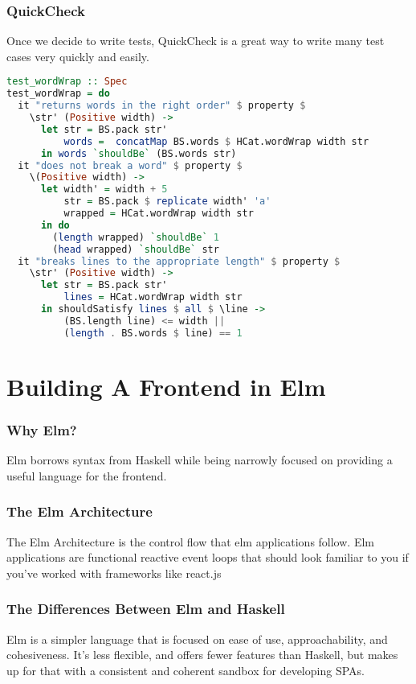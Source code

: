 \documentclass{beamer}
\begin{document}
\begin{frame}[fragile]
  \frametitle{QuickCheck}
  Once we decide to write tests, QuickCheck is a great way to write
  many test cases very quickly and easily.
\begin{lstlisting}[language=haskell]
test_wordWrap :: Spec
test_wordWrap = do
  it "returns words in the right order" $ property $
    \str' (Positive width) ->
      let str = BS.pack str'
          words =  concatMap BS.words $ HCat.wordWrap width str
      in words `shouldBe` (BS.words str)
  it "does not break a word" $ property $
    \(Positive width) ->
      let width' = width + 5
          str = BS.pack $ replicate width' 'a'
          wrapped = HCat.wordWrap width str
      in do
        (length wrapped) `shouldBe` 1
        (head wrapped) `shouldBe` str
  it "breaks lines to the appropriate length" $ property $
    \str' (Positive width) ->
      let str = BS.pack str'
          lines = HCat.wordWrap width str
      in shouldSatisfy lines $ all $ \line ->
          (BS.length line) <= width ||
          (length . BS.words $ line) == 1
\end{lstlisting}
\end{frame}

\section{Building A Frontend in Elm}

\begin{frame}
  \frametitle{Why Elm?}
  Elm borrows syntax from Haskell while being narrowly focused on
  providing a useful language for the frontend.
\end{frame}

\begin{frame}
  \frametitle{The Elm Architecture}
  The Elm Architecture is the control flow that elm applications
  follow.  Elm applications are functional reactive event loops that
  should look familiar to you if you've worked with frameworks like
  react.js
\end{frame}

\begin{frame}
  \frametitle{The Differences Between Elm and Haskell}
  Elm is a simpler language that is focused on ease of use,
  approachability, and cohesiveness.  It's less flexible, and offers
  fewer features than Haskell, but makes up for that with a consistent
  and coherent sandbox for developing SPAs.
\end{frame}
\end{document}
